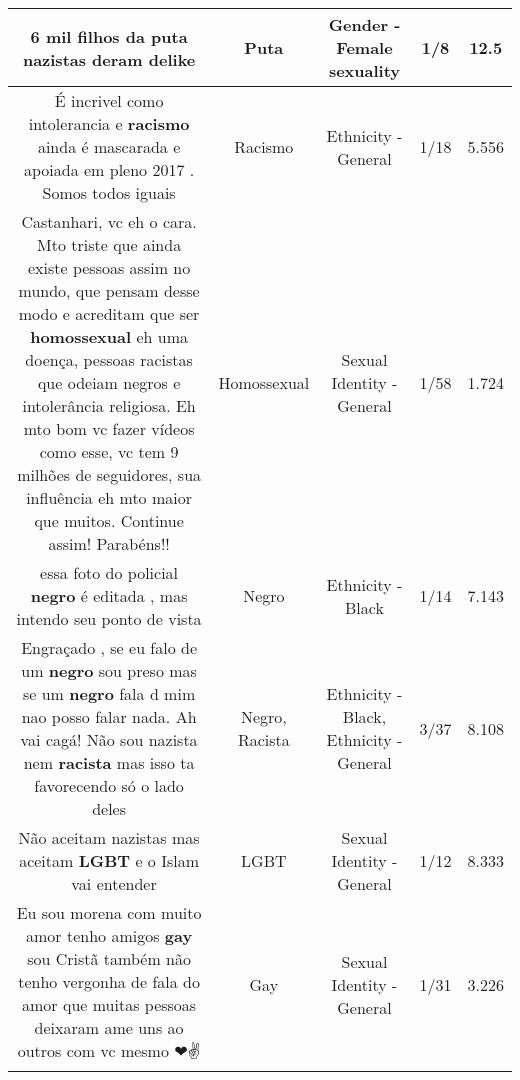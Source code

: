 \documentclass[11pt]{article}
\newlength\mylength
\begin{document}
\begin{center}
\begin{longtable}{|C{.65\mylength}|C{.30\mylength}|C{.12\mylength}|C{.12\mylength}|C{.12\mylength}|}
  \small 6 mil filhos da \textbf{puta} nazistas deram delike\normalsize   & Puta & Gender - Female sexuality & 1/8 & 12.5 \\  \hline
  \small É incrivel como intolerancia e \textbf{racismo}  ainda é mascarada e apoiada em pleno 2017 . Somos todos iguais\normalsize   & Racismo & Ethnicity - General & 1/18 & 5.556 \\  \hline
  \small Castanhari, vc eh o cara. Mto triste que ainda existe pessoas assim no mundo, que pensam desse modo e acreditam que ser \textbf{homossexual} eh uma doença, pessoas racistas que odeiam negros e intolerância religiosa. Eh mto bom vc fazer vídeos como esse, vc tem 9 milhões de seguidores, sua influência eh mto maior que muitos. Continue assim! Parabéns!!\normalsize   & Homossexual & Sexual Identity - General & 1/58 & 1.724 \\  \hline
  \small essa foto do policial \textbf{negro} é editada , mas intendo seu ponto de vista\normalsize   & Negro & Ethnicity - Black & 1/14 & 7.143 \\  \hline
  \small Engraçado , se eu falo de um \textbf{negro} sou preso mas se um \textbf{negro} fala d mim nao posso falar nada. Ah vai cagá! Não sou nazista nem \textbf{racista} mas isso ta favorecendo só o lado deles\normalsize   & Negro, Racista & Ethnicity - Black, Ethnicity - General & 3/37 & 8.108 \\  \hline
  \small Não aceitam nazistas mas aceitam \textbf{LGBT} e o Islam 🤔 vai entender\normalsize   & LGBT & Sexual Identity - General & 1/12 & 8.333 \\  \hline
  \small Eu sou morena com muito amor tenho amigos \textbf{gay} sou Cristã também não tenho vergonha de fala do amor que muitas pessoas deixaram ame uns ao outros com vc mesmo ❤✌\normalsize   & Gay & Sexual Identity - General & 1/31 & 3.226 \\  \hline

\end{longtable}
\end{center}
\end{document}
